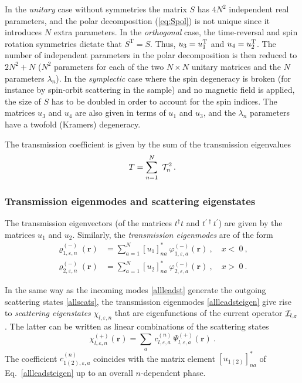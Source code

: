 \documentclass[a4paper,10pt]{article}
\newcommand{\br}{\mathbf{r}}
\newcommand{\nin}{\noindent}
\begin{document}
\nin In the {\it unitary} case without symmetries the matrix $S$ has $4N^{2}$ independent real parameters, and the polar decomposition (\ref{eq:Spol}) is not unique since it introduces $N$ extra parameters. In the {\it orthogonal} case, the time-reversal and spin rotation symmetries dictate that $S^{\mathrm{T}}=S$. Thus, $u_{3} = u_{1}^{\rm T}$ and $u_{4} = u_{2}^{\rm T}$. The number of independent parameters in the polar decomposition is then reduced to $2N^{2}+N$ ($N^{2}$ parameters for each of the two $N \! \times \! N$ unitary matrices and the $N$ parameters $\lambda_n$). In the {\it symplectic} case where the spin degeneracy is broken (for instance by spin-orbit scattering in the sample) and no magnetic field is applied, the size of $S$ has to be doubled in order to account for the spin indices. The matrices $u_{3}$ and $u_{4}$ are also given \cite{mellopichard} in terms of $u_{1}$ and $u_{3}$, and the $\lambda_n$ parameters have a twofold (Kramers) degeneracy.

\nin The transmission coefficient is given by the sum of the transmission eigenvalues 
\begin{equation}
T = \sum_{n=1}^{N} \ {\cal T}_n^2 \, .
\label{eq:geigen}
\end{equation} 

\subsubsection{Transmission eigenmodes and scattering eigenstates}

\nin The transmission eigenvectors (of the matrices $t^\dagger t$ and 
$t^{\prime \dagger} t^{\prime}$) are given by the matrices $u_{1}$ and $u_{2}$. Similarly, the {\it transmission eigenmodes} are of the form
%
\begin{subequations}
\label{allleadsteigen} 
\begin{align}
\varrho_{1,\varepsilon,n}^{(-)}(\br) &=
\sum_{a=1}^{N} \left[u_{1}\right]_{n a}^{*} \
\varphi_{1,\varepsilon,a}^{(-)}(\br)
 \ , \quad x <  \ 0 \ ,
\\
\varrho_{2,\varepsilon,n}^{(-)}(\br) &=
\sum_{a=1}^{N} \left[u_{2}\right]_{n a}^{*} \
\varphi_{2,\varepsilon,a}^{(-)}(\br)
\ , \quad x >  \ 0 \ .
\end{align}
\end{subequations}

\nin In the same way as the incoming modes \eqref{allleadst} generate the outgoing scattering states \eqref{allscats}, the transmission eigenmodes \eqref{allleadsteigen} give rise to 
{\it scattering eigenstates} $\chi_{l,\varepsilon,n}$ that are eigenfunctions of the current 
operator ${\cal I}_{l,\varepsilon}$.  
The latter can be written as linear combinations of the scattering states
%
\begin{equation}
\label{psi_magic1}
\chi^{(+)}_{l,\varepsilon,n}(\br)=\sum_a\, c^{(n)}_{l,\varepsilon,a}\,\Psi^{(+)}_{l,\varepsilon,a}(\br) \ .
\end{equation}
%
The coefficient $c^{(n)}_{1(2),\varepsilon,a}$ coincides with the matrix element 
$\left[u_{1(2)}\right]_{na}^{*}$ of Eq.\ \eqref{allleadsteigen} up to an overall $n$-dependent phase.
\end{document}

